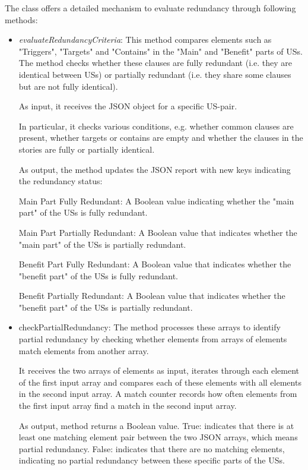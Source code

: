 The class offers a detailed mechanism to evaluate redundancy through following methods:
\begin{itemize}
	\item\textit{evaluateRedundancyCriteria}: This method compares elements such as "Triggers", "Targets" and "Contains" in the "Main" and "Benefit" parts of USs. The method checks whether these clauses are fully redundant (i.e. they are identical between USs) or partially redundant (i.e. they share some clauses but are not fully identical).

	As input, it receives the JSON object for a specific US-pair.

	In particular, it checks various conditions, e.g. whether common clauses are present, whether targets or contains are empty and whether the clauses in the stories are fully or partially identical.

	As output, the method updates the JSON report with new keys indicating the redundancy status:

	Main Part Fully Redundant: A Boolean value indicating whether the "main part" of the USs is fully redundant.

	Main Part Partially Redundant: A Boolean value that indicates whether the "main part" of the USs is partially redundant.

	Benefit Part Fully Redundant: A Boolean value that indicates whether the "benefit part" of the USs is fully redundant.

	Benefit Partially Redundant: A Boolean value that indicates whether the "benefit part" of the USs is partially redundant.
	 
	 \item checkPartialRedundancy: The method processes these arrays to identify partial redundancy by checking whether elements from arrays of elements match elements from another array. 
	 
	 It receives the two arrays of elements as input, iterates through each element of the first input array and compares each of these elements with all elements in the second input array. A match counter records how often elements from the first input array find a match in the second input array.
	 
	 As output, method returns a Boolean value. True: indicates that there is at least one matching element pair between the two JSON arrays, which means partial redundancy. False: indicates that there are no matching elements, indicating no partial redundancy between these specific parts of the USs.
	 

\end{itemize}
